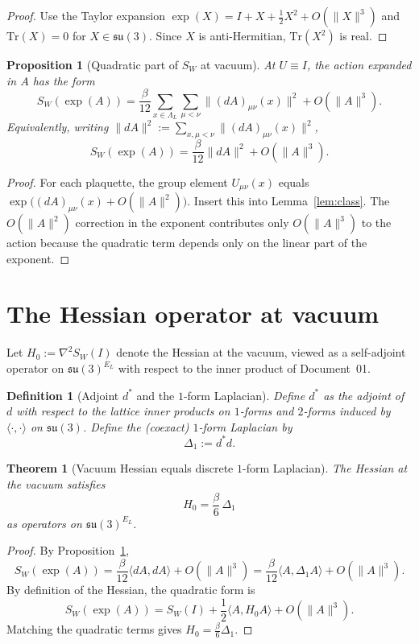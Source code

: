 \documentclass[11pt]{article}
\newtheorem{definition}{Definition}
\newtheorem{proposition}{Proposition}
\newtheorem{theorem}{Theorem}
\begin{document}
\begin{proof}
Use the Taylor expansion $\exp(X)=I+X+\tfrac12X^2+O(\|X\|^3)$ and $\mathrm{Tr}(X)=0$ for $X\in\mathfrak{su}(3)$.
Since $X$ is anti-Hermitian, $\mathrm{Tr}(X^2)$ is real.
\end{proof}

\begin{proposition}[Quadratic part of $S_W$ at vacuum]\label{prop:quad}
At $U\equiv I$, the action expanded in $A$ has the form
\[
S_W(\exp(A)) = \frac{\beta}{12}\sum_{x\in\Lambda_L}\sum_{\mu<\nu}\| (dA)_{\mu\nu}(x)\|^2 + O(\|A\|^3).
\]
Equivalently, writing $\|dA\|^2:=\sum_{x,\mu<\nu}\|(dA)_{\mu\nu}(x)\|^2$,
\[
S_W(\exp(A)) = \frac{\beta}{12}\|dA\|^2+O(\|A\|^3).
\]
\end{proposition}

\begin{proof}
For each plaquette, the group element $U_{\mu\nu}(x)$ equals $\exp\!\big((dA)_{\mu\nu}(x)+O(\|A\|^2)\big)$.
Insert this into Lemma~\ref{lem:class}.  The $O(\|A\|^2)$ correction in the exponent contributes only $O(\|A\|^3)$ to the action because the quadratic term depends only on the linear part of the exponent.
\end{proof}

\section{The Hessian operator at vacuum}

Let $H_0:=\nabla^2 S_W(I)$ denote the Hessian at the vacuum, viewed as a self-adjoint operator on $\mathfrak{su}(3)^{E_L}$ with respect to the inner product of Document~01.

\begin{definition}[Adjoint $d^\ast$ and the $1$-form Laplacian]
Define $d^\ast$ as the adjoint of $d$ with respect to the lattice inner products on $1$-forms and $2$-forms induced by $\langle\cdot,\cdot\rangle$ on $\mathfrak{su}(3)$.
Define the (coexact) $1$-form Laplacian by
\[
\Delta_1 := d^\ast d.
\]
\end{definition}

\begin{theorem}[Vacuum Hessian equals discrete $1$-form Laplacian]\label{thm:H0}
The Hessian at the vacuum satisfies
\[
H_0 = \frac{\beta}{6}\,\Delta_1
\]
as operators on $\mathfrak{su}(3)^{E_L}$.
\end{theorem}

\begin{proof}
By Proposition~\ref{prop:quad},
\[
S_W(\exp(A)) = \frac{\beta}{12}\langle dA,dA\rangle + O(\|A\|^3) = \frac{\beta}{12}\langle A,\Delta_1 A\rangle + O(\|A\|^3).
\]
By definition of the Hessian, the quadratic form is
\[
S_W(\exp(A)) = S_W(I) + \frac12\langle A,H_0 A\rangle + O(\|A\|^3).
\]
Matching the quadratic terms gives $H_0=\frac{\beta}{6}\Delta_1$.
\end{proof}
\end{document}
